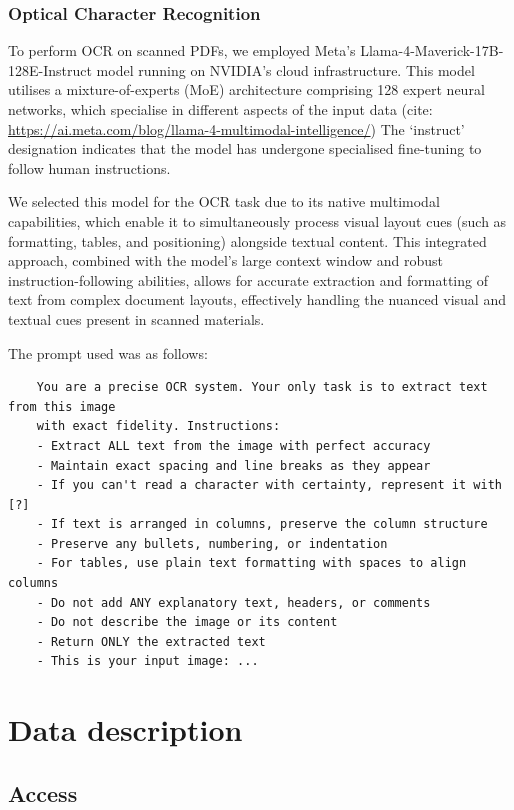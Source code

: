 \documentclass[12pt]{article}
\newcommand{\m}[0]{\color{maroon}}
\begin{document}
\subsubsection{Optical Character Recognition}

To perform OCR on scanned PDFs, 
we employed Meta's Llama-4-Maverick-17B-128E-Instruct model running on NVIDIA's cloud infrastructure. 
This model utilises a mixture-of-experts (MoE) architecture comprising 128 expert neural networks,
which specialise in different aspects of the input data
({\m cite: \url{https://ai.meta.com/blog/llama-4-multimodal-intelligence/}})
The `instruct' designation indicates that the model has undergone specialised fine-tuning to follow human instructions. 

We selected this model for the OCR task due to its native multimodal capabilities, 
which enable it to simultaneously process visual layout cues (such as formatting, tables, and positioning) alongside textual content. 
This integrated approach, combined with the model's large context window and robust instruction-following abilities, 
allows for accurate extraction and formatting of text from complex document layouts, 
effectively handling the nuanced visual and textual cues present in scanned materials.

The prompt used was as follows:
{\small 
\begin{verbatim}
    You are a precise OCR system. Your only task is to extract text from this image 
    with exact fidelity. Instructions:
    - Extract ALL text from the image with perfect accuracy
    - Maintain exact spacing and line breaks as they appear
    - If you can't read a character with certainty, represent it with [?]
    - If text is arranged in columns, preserve the column structure
    - Preserve any bullets, numbering, or indentation
    - For tables, use plain text formatting with spaces to align columns
    - Do not add ANY explanatory text, headers, or comments
    - Do not describe the image or its content
    - Return ONLY the extracted text
    - This is your input image: ...
\end{verbatim}
}

\section{Data description}

\subsection{Access}
\end{document}

